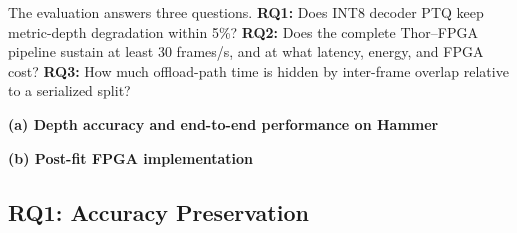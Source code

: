 \documentclass[sigconf]{support/acmart}
\begin{document}
The evaluation answers three questions.  \textbf{RQ1:} Does INT8 decoder PTQ
keep metric-depth degradation within 5\%?  \textbf{RQ2:} Does the complete
Thor--FPGA pipeline sustain at least 30 frames/s, and at what latency, energy,
and FPGA cost?  \textbf{RQ3:} How much offload-path time is hidden by
inter-frame overlap relative to a serialized split?

\begin{table}[t]
  \caption{Primary accuracy, systems, and FPGA results.  All numerical cells
  are intentionally blank until reproduced on the final software/bitstream.}
  \label{tab:primary}
  \centering
  \small
  \textbf{(a) Depth accuracy and end-to-end performance on Hammer}\par\smallskip

  \vspace{0.6em}
  \textbf{(b) Post-fit FPGA implementation}\par\smallskip
\end{table}

\subsection{RQ1: Accuracy Preservation}
\end{document}
